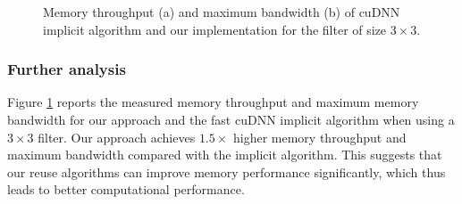 \begin{figure}[t!]
\centering

 \hspace{0em}


	
\caption{Memory throughput (a) and maximum bandwidth (b) of cuDNN implicit algorithm and our implementation for the filter of size $3 \times 3$.}
\label{fig:depwisememanaly}
\vspace{-2mm}
\end{figure}

\subsubsection{Further analysis}
Figure \ref{fig:depwisememanaly} reports the measured memory throughput and maximum memory bandwidth for our approach and the fast cuDNN
implicit algorithm when using a $3 \times 3$ filter. Our approach achieves $1.5 \times$ higher memory throughput and maximum
bandwidth compared with the implicit algorithm. This suggests that our reuse algorithms can improve memory performance significantly, which
thus leads to better computational performance.


